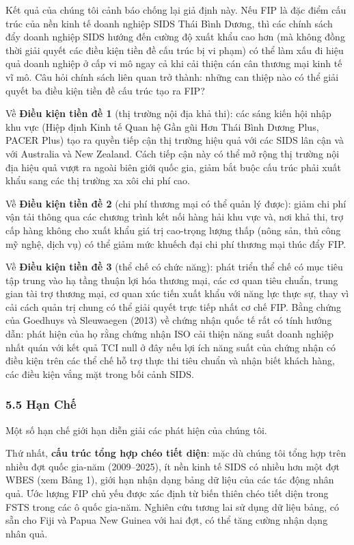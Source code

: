 \documentclass[12pt,a4paper]{article}
\begin{document}
Kết quả của chúng tôi cảnh báo chống lại giả định này. Nếu FIP là đặc
điểm cấu trúc của nền kinh tế doanh nghiệp SIDS Thái Bình Dương, thì các
chính sách đẩy doanh nghiệp SIDS hướng đến cường độ xuất khẩu cao hơn
(mà không đồng thời giải quyết các điều kiện tiền đề cấu trúc bị vi
phạm) có thể làm xấu đi hiệu quả doanh nghiệp ở cấp vi mô ngay cả khi
cải thiện cán cân thương mại kinh tế vĩ mô. Câu hỏi chính sách liên quan
trở thành: những can thiệp nào có thể giải quyết ba điều kiện tiền đề
cấu trúc tạo ra FIP?

Về \textbf{Điều kiện tiền đề 1} (thị trường nội địa khả thi): các sáng
kiến hội nhập khu vực (Hiệp định Kinh tế Quan hệ Gần gũi Hơn Thái Bình
Dương Plus, PACER Plus) tạo ra quyền tiếp cận thị trường hiệu quả với
các SIDS lân cận và với Australia và New Zealand. Cách tiếp cận này có
thể mở rộng thị trường nội địa hiệu quả vượt ra ngoài biên giới quốc
gia, giảm bắt buộc cấu trúc phải xuất khẩu sang các thị trường xa xôi
chi phí cao.

Về \textbf{Điều kiện tiền đề 2} (chi phí thương mại có thể quản lý
được): giảm chi phí vận tải thông qua các chương trình kết nối hàng hải
khu vực và, nơi khả thi, trợ cấp hàng không cho xuất khẩu giá trị
cao-trọng lượng thấp (nông sản, thủ công mỹ nghệ, dịch vụ) có thể giảm
mức khuếch đại chi phí thương mại thúc đẩy FIP.

Về \textbf{Điều kiện tiền đề 3} (thể chế có chức năng): phát triển thể
chế có mục tiêu tập trung vào hạ tầng thuận lợi hóa thương mại, các cơ
quan tiêu chuẩn, trung gian tài trợ thương mại, cơ quan xúc tiến xuất
khẩu với năng lực thực sự, thay vì cải cách quản trị chung có thể giải
quyết trực tiếp nhất cơ chế FIP. Bằng chứng của Goedhuys và Sleuwaegen
(2013) về chứng nhận quốc tế rất có tính hướng dẫn: phát hiện của họ
rằng chứng nhận ISO cải thiện năng suất doanh nghiệp nhất quán với kết
quả TCI null ở đây nếu lợi ích năng suất của chứng nhận có điều kiện
trên các thể chế hỗ trợ thực thi tiêu chuẩn và nhận biết khách hàng, các
điều kiện vắng mặt trong bối cảnh SIDS.

\hypertarget{55-hux1ea1n-chux1ebf}{%
\subsubsection{5.5 Hạn Chế}\label{55-hux1ea1n-chux1ebf}}

Một số hạn chế giới hạn diễn giải các phát hiện của chúng tôi.

Thứ nhất, \textbf{cấu trúc tổng hợp chéo tiết diện}: mặc dù chúng tôi
tổng hợp trên nhiều đợt quốc gia-năm (2009--2025), ít nền kinh tế SIDS
có nhiều hơn một đợt WBES (xem Bảng 1), giới hạn nhận dạng bảng dữ liệu
của các tác động nhân quả. Ước lượng FIP chủ yếu được xác định từ biến
thiên chéo tiết diện trong FSTS trong các ô quốc gia-năm. Nghiên cứu
tương lai sử dụng dữ liệu bảng, có sẵn cho Fiji và Papua New Guinea với
hai đợt, có thể tăng cường nhận dạng nhân quả.
\end{document}
